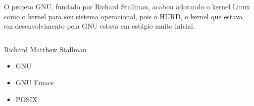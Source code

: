 \documentclass{beamer}
\begin{document}
\begin{frame}
  O projeto GNU, fundado por Richard Stallman, acabou adotando o kernel
  Linux como o kernel para seu sistema operacional, pois o HURD, o
  kernel que estava em desenvolvimento pela GNU estava em estágio muito
  inicial.
  
  \begin{columns}

    \begin{block}{Richard Matthew Stallman}

      \begin{figure}
      \end{figure}

      \begin{itemize}
      \item GNU
      \item GNU Emacs
      \item POSIX
      \end{itemize}

    \end{block}

  \end{columns}
\end{frame}
\end{document}
